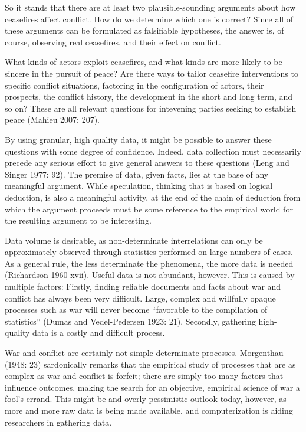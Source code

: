\documentclass[12pt,twoside]{reedthesis}
\begin{document}
So it stands that there are at least two plausible-sounding arguments
about how ceasefires affect conflict. How do we determine which one is
correct? Since all of these arguments can be formulated as falsifiable
hypotheses, the answer is, of course, observing real ceasefires, and
their effect on conflict.

What kinds of actors exploit ceasefires, and what kinds are more likely
to be sincere in the pursuit of peace? Are there ways to tailor
ceasefire interventions to specific conflict situations, factoring in
the configuration of actors, their prospects, the conflict history, the
development in the short and long term, and so on? These are all
relevant questions for intevening parties seeking to establish peace
(Mahieu 2007: 207).

By using granular, high quality data, it might be possible to answer
these questions with some degree of confidence. Indeed, data collection
must necessarily precede any serious effort to give general answers to
these questions (Leng and Singer 1977: 92). The premise of data, given
facts, lies at the base of any meaningful argument. While speculation,
thinking that is based on logical deduction, is also a meaningful
activity, at the end of the chain of deduction from which the argument
proceeds must be some reference to the empirical world for the resulting
argument to be interesting.

Data volume is desirable, as non-determinate interrelations can only be
approximately observed through statistics performed on large numbers of
cases. As a general rule, the less determinate the phenomena, the more
data is needed (Richardson 1960 xvii). Useful data is not abundant,
however. This is caused by multiple factors: Firstly, finding reliable
documents and facts about war and conflict has always been very
difficult. Large, complex and willfully opaque processes such as war
will never become ``favorable to the compilation of statistics'' (Dumas
and Vedel-Pedersen 1923: 21). Secondly, gathering high-quality data is a
costly and difficult process.

War and conflict are certainly not simple determinate processes.
Morgenthau (1948: 23) sardonically remarks that the empirical study of
processes that are as complex as war and conflict is forfeit; there are
simply too many factors that influence outcomes, making the search for
an objective, empirical science of war a fool's errand. This might be
and overly pessimistic outlook today, however, as more and more raw data
is being made available, and computerization is aiding researchers in
gathering data.
\end{document}
